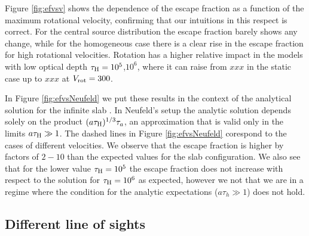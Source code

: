 \documentclass[usenatbib]{mn2e}
\newcommand{\ly}{{\ifmmode{{\rm Ly}\alpha~}\else{Ly$\alpha$~}\fi}}
\newcommand{\kms}{{\ifmmode{{\mathrm{\,km\ s}^{-1}}}\else{\,km~s$^{-1}$}\fi}}
\begin{document}


Figure \ref{fig:efvsv} shows the dependence of the escape fraction as
a function of the maximum rotational velocity, confirming that our
intuitions in this respect is correct. For the central source
distribution the escape fraction barely shows any change, while for
the homogeneous case there is a clear rise in the escape fraction for
high rotational velocities.  Rotation has a higher relative impact in
the models with low optical depth $\tau_{\rm H}=10^5$,$10^{6}$, where
it can raise from $xxx$ in the static case up to $xxx$ at $V_{\rm
  rot}=300$\kms. 




In Figure \ref{fig:efvsNeufeld} we put these results in the context of
the analytical solution for the infinite slab \citep{Neufeld90}. In
Neufeld's setup the analytic solution depends solely on the product
$(a\tau_{\rm   H})^{1/3}\tau_{a}$, an approximation that is valid only
in the limits $a\tau_{\rm   H}\gg 1$. The dashed lines in Figure
\ref{fig:efvsNeufeld} corespond to the cases of different
velocities. We observe that the escape fraction is higher
by factors of $2-10$  than the expected values for the slab
configuration. We also see that for the lower value $\tau_{\rm
  H}=10^{5}$ the escape fraction does not increase with respect to the
solution for $\tau_{\rm H}=10^{6}$ as expected, however we not that we
are in a regime where the condition for the analytic expectations 
($a\tau_{h}\gg 1$) does not hold.



\subsection{Different line of sights}
\end{document}

